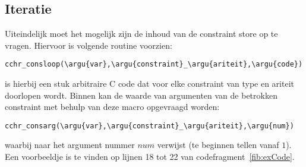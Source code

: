 \subsection{Iteratie}

Uiteindelijk moet het mogelijk zijn de inhoud van de constraint store op te vragen. Hiervoor is volgende routine voorzien: \begin{Verbatim}[commandchars=\\\{\}]
  cchr_consloop(\argu{var},\argu{constraint}_\argu{ariteit},\argu{code})
\end{Verbatim}
 is hierbij een stuk arbitraire C code dat voor elke constraint van type  en ariteit  doorlopen wordt. Binnen  kan de waarde van argumenten van de betrokken constraint met behulp van deze macro opgevraagd worden: \begin{Verbatim}[commandchars=\\\{\}]
  cchr_consarg(\argu{var},\argu{constraint}_\argu{ariteit},\argu{num})
\end{Verbatim}
waarbij  naar het argument nummer $num$ verwijst (te beginnen tellen vanaf $1$). Een voorbeeldje is te vinden op lijnen 18 tot 22 van codefragment~\ref{fib:exCode}.
